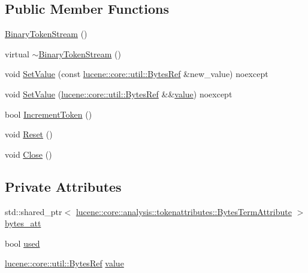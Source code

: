 \subsection*{Public Member Functions}
\begin{DoxyCompactItemize}
\item 
\mbox{\hyperlink{classlucene_1_1core_1_1document_1_1Field_1_1BinaryTokenStream_a24a97190071bfedab20a0db755928732}{Binary\+Token\+Stream}} ()
\item 
virtual \mbox{\hyperlink{classlucene_1_1core_1_1document_1_1Field_1_1BinaryTokenStream_aac6e4bf25db86723dba21faf789de9d0}{$\sim$\+Binary\+Token\+Stream}} ()
\item 
void \mbox{\hyperlink{classlucene_1_1core_1_1document_1_1Field_1_1BinaryTokenStream_af69fef506c491a451cb5ac1bca9f3ac4}{Set\+Value}} (const \mbox{\hyperlink{classlucene_1_1core_1_1util_1_1BytesRef}{lucene\+::core\+::util\+::\+Bytes\+Ref}} \&new\+\_\+value) noexcept
\item 
void \mbox{\hyperlink{classlucene_1_1core_1_1document_1_1Field_1_1BinaryTokenStream_a6c5fcb0fc5397ab56af07a57e2d6544c}{Set\+Value}} (\mbox{\hyperlink{classlucene_1_1core_1_1util_1_1BytesRef}{lucene\+::core\+::util\+::\+Bytes\+Ref}} \&\&\mbox{\hyperlink{classlucene_1_1core_1_1document_1_1Field_1_1BinaryTokenStream_af19e816feca1fda691a9f8ad505ac97a}{value}}) noexcept
\item 
bool \mbox{\hyperlink{classlucene_1_1core_1_1document_1_1Field_1_1BinaryTokenStream_a98dee5401b26bdaab935f66a37abae29}{Increment\+Token}} ()
\item 
void \mbox{\hyperlink{classlucene_1_1core_1_1document_1_1Field_1_1BinaryTokenStream_adc2b2b0a6ea02054dfe5159628861911}{Reset}} ()
\item 
void \mbox{\hyperlink{classlucene_1_1core_1_1document_1_1Field_1_1BinaryTokenStream_a40c73dd8eae9ab36e7e8f9e859a037ae}{Close}} ()
\end{DoxyCompactItemize}
\subsection*{Private Attributes}
\begin{DoxyCompactItemize}
\item 
std\+::shared\+\_\+ptr$<$ \mbox{\hyperlink{classlucene_1_1core_1_1analysis_1_1tokenattributes_1_1BytesTermAttribute}{lucene\+::core\+::analysis\+::tokenattributes\+::\+Bytes\+Term\+Attribute}} $>$ \mbox{\hyperlink{classlucene_1_1core_1_1document_1_1Field_1_1BinaryTokenStream_a3a9a7f10f40cde8b2c37b9e65340083c}{bytes\+\_\+att}}
\item 
bool \mbox{\hyperlink{classlucene_1_1core_1_1document_1_1Field_1_1BinaryTokenStream_a56fb807096b736bcc128ced9cabf98f0}{used}}
\item 
\mbox{\hyperlink{classlucene_1_1core_1_1util_1_1BytesRef}{lucene\+::core\+::util\+::\+Bytes\+Ref}} \mbox{\hyperlink{classlucene_1_1core_1_1document_1_1Field_1_1BinaryTokenStream_af19e816feca1fda691a9f8ad505ac97a}{value}}
\end{DoxyCompactItemize}
